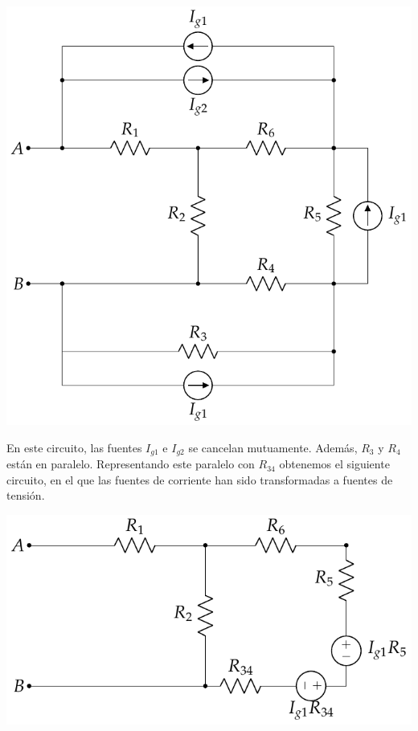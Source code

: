 \documentclass[12pt]{article}
\begin{document}
\begin{center}
\includegraphics[height = 0.4\textheight]{figs/movilidad1.pdf}  
\end{center}

En este circuito, las fuentes $I_{g1}$ e $I_{g2}$ se cancelan mutuamente. Además, $R_3$ y $R_4$ están en paralelo. Representando este paralelo con $R_{34}$ obtenemos el siguiente circuito, en el que las fuentes de corriente han sido transformadas a fuentes de tensión.

\begin{center}
\includegraphics[height = 0.2\textheight]{figs/movilidad2.pdf}
\end{center}
\end{document}
